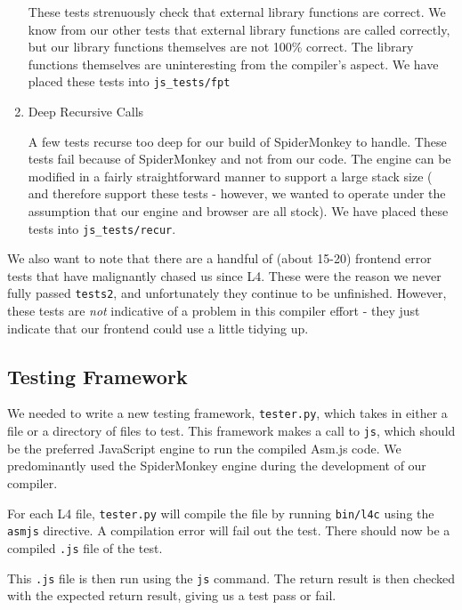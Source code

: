 \documentclass[twoside]{article}
\begin{document}
\begin{multicols}{2}
\begin{enumerate}
    These tests strenuously check that external library functions are correct.
    We know from our other tests that external library functions are called
    correctly, but our library functions themselves are not 100\% correct.
    The library functions themselves are uninteresting from the compiler's
    aspect. We have placed these tests into \texttt{js\_tests/fpt}

  \item Deep Recursive Calls

    A few tests recurse too deep for our build of SpiderMonkey to handle. These
    tests fail because of SpiderMonkey and not from our code. The engine can be 
    modified in a fairly straightforward manner to support a large stack size (
    and therefore support these tests - however, we wanted to operate under the 
    assumption that our engine and browser are all stock). We have placed
    these tests into \texttt{js\_tests/recur}. 

\end{enumerate}

We also want to note that there are a handful of (about 15-20) frontend error
tests that have malignantly chased us since L4. These were the reason we never
fully passed \texttt{tests2}, and unfortunately they continue to be unfinished. 
However, these tests are \emph{not} indicative of a problem in this compiler effort -
they just indicate that our frontend could use a little tidying up.

\subsection{Testing Framework}

We needed to write a new testing framework, \texttt{tester.py}, which takes in either a
file or a directory of files to test. This framework makes a call to \texttt{js},
which should be the preferred JavaScript engine to run the compiled Asm.js code.
We predominantly used the SpiderMonkey engine during the development of our
compiler.

For each L4 file, \texttt{tester.py} will compile the file by running \texttt{bin/l4c} 
using the \texttt{asmjs} directive. A compilation error will fail out the test. There 
should now be a compiled \texttt{.js} file of the test.

This \texttt{.js} file is then run using the \texttt{js} command. The return
result is then checked with the expected return result, giving us a test pass
or fail.


\end{multicols}
\end{document}
